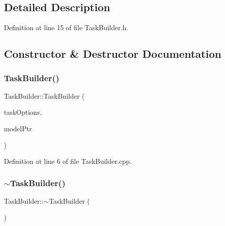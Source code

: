 \subsection{Detailed Description}


Definition at line 15 of file Task\+Builder.\+h.



\subsection{Constructor \& Destructor Documentation}
\hypertarget{classocra_1_1TaskBuilder_a47da2d3a4f793620895f5eda79ea80f6}{}\label{classocra_1_1TaskBuilder_a47da2d3a4f793620895f5eda79ea80f6} 
\subsubsection{\texorpdfstring{Task\+Builder()}{TaskBuilder()}}
{\footnotesize\ttfamily Task\+Builder\+::\+Task\+Builder (\begin{DoxyParamCaption}\item[{const \hyperlink{classocra_1_1TaskBuilderOptions}{Task\+Builder\+Options} \&}]{task\+Options,  }\item[{Model\+::\+Ptr}]{model\+Ptr }\end{DoxyParamCaption})}



Definition at line 6 of file Task\+Builder.\+cpp.

\hypertarget{classocra_1_1TaskBuilder_ac4a6e94f7e39db652819ebbd99e2a334}{}\label{classocra_1_1TaskBuilder_ac4a6e94f7e39db652819ebbd99e2a334} 
\subsubsection{\texorpdfstring{$\sim$\+Task\+Builder()}{~TaskBuilder()}}
{\footnotesize\ttfamily Task\+Builder\+::$\sim$\+Task\+Builder (\begin{DoxyParamCaption}{ }\end{DoxyParamCaption})\hspace{0.3cm}{\ttfamily [virtual]}}



